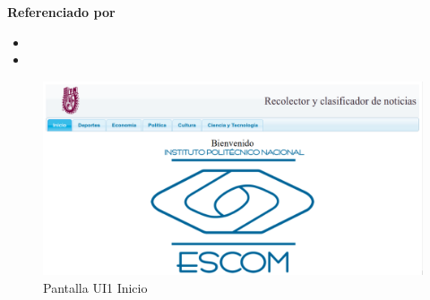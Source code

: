 \begin{large}
  \textbf{Referenciado por}
\end{large}

\begin{itemize}

  \item {}
  \item {}

\end{itemize}  


\begin{figure}
  \centering
	\includegraphics[scale=.32]{imagenes/Pantallas/UI1}
  \caption{Pantalla UI1 Inicio}
  \label{fig:UI1}
\end{figure}


